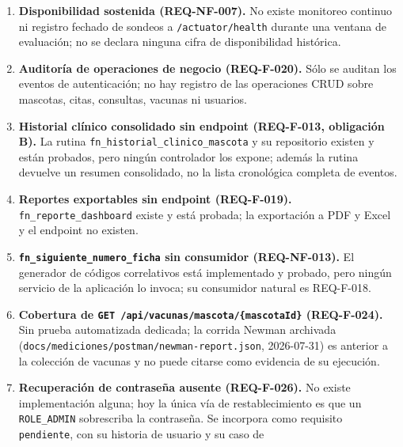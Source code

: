 \documentclass[
  spanish,
]{article}
\begin{document}
\begin{enumerate}
  Edge, y sin configuración específica de compatibilidad en el
  repositorio (no hay \texttt{browserslist} propio). Ninguno de sus
  criterios tiene artefacto, por lo que el requisito queda
  \texttt{pendiente}.
\item
  \textbf{Disponibilidad sostenida (REQ-NF-007).} No existe monitoreo
  continuo ni registro fechado de sondeos a \texttt{/\allowbreak{}actuator/\allowbreak{}health}
  durante una ventana de evaluación; no se declara ninguna cifra de
  disponibilidad histórica.
\item
  \textbf{Auditoría de operaciones de negocio (REQ-F-020).} Sólo se
  auditan los eventos de autenticación; no hay registro de las
  operaciones CRUD sobre mascotas, citas, consultas, vacunas ni
  usuarios.
\item
  \textbf{Historial clínico consolidado sin endpoint (REQ-F-013,
  obligación B).} La rutina \texttt{fn\_\allowbreak{}historial\_\allowbreak{}clini\allowbreak{}co\_\allowbreak{}mascota} y
  su repositorio existen y están probados, pero ningún controlador los
  expone; además la rutina devuelve un resumen consolidado, no la lista
  cronológica completa de eventos.
\item
  \textbf{Reportes exportables sin endpoint (REQ-F-019).}
  \texttt{fn\_\allowbreak{}reporte\_\allowbreak{}dashboa\allowbreak{}rd} existe y está probada; la exportación
  a PDF y Excel y el endpoint no existen.
\item
  \textbf{\texttt{fn\_\allowbreak{}siguiente\_\allowbreak{}numer\allowbreak{}o\_\allowbreak{}ficha} sin consumidor
  (REQ-NF-013).} El generador de códigos correlativos está implementado
  y probado, pero ningún servicio de la aplicación lo invoca; su
  consumidor natural es REQ-F-018.
\item
  \textbf{Cobertura de \texttt{GET\ /\allowbreak{}api/\allowbreak{}vacunas/\allowbreak{}mascota/\allowbreak{}\{mascota\allowbreak{}Id\}}
  (REQ-F-024).} Sin prueba automatizada dedicada; la corrida Newman
  archivada (\texttt{docs/\allowbreak{}mediciones/\allowbreak{}postman/\allowbreak{}newman-\allowbreak{}report.\allowbreak{}json},
  2026-07-31) es anterior a la colección de vacunas y no puede citarse
  como evidencia de su ejecución.
\item
  \textbf{Recuperación de contraseña ausente (REQ-F-026).} No existe
  implementación alguna; hoy la única vía de restablecimiento es que un
  \texttt{ROLE\_\allowbreak{}ADMIN} sobrescriba la contraseña. Se incorpora como
  requisito \texttt{pendiente}, con su historia de usuario y su caso de

\end{enumerate}
\end{document}
